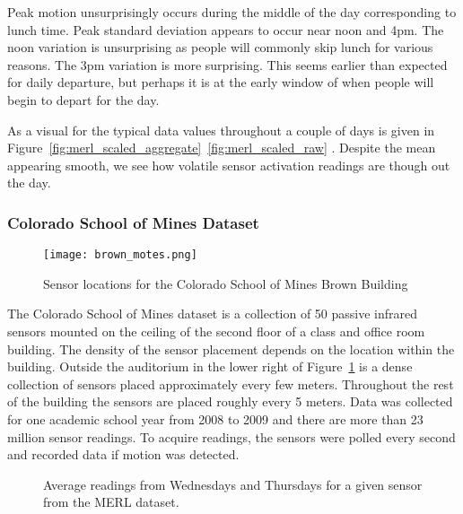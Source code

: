 Peak motion unsurprisingly occurs during the middle of the day corresponding to lunch time.  Peak standard deviation appears to occur near noon and 4pm.  The noon variation is unsurprising as people will commonly skip lunch for various reasons.  The 3pm variation is more surprising.  This seems earlier than expected for daily departure, but perhaps it is at the early window of when people will begin to depart for the day.  

As a visual for the typical data values throughout a couple of days is given in Figure~\ref{fig:merl_scaled_aggregate}~\ref{fig:merl_scaled_raw} .  Despite the mean appearing smooth, we see how volatile sensor activation readings are though out the day.


\subsubsection{Colorado School of Mines Dataset}

\begin{figure}[t!]
	\begin{center}
		\texttt{[image: brown\_motes.png]}
	\end{center}
	\caption{Sensor locations for the Colorado School of Mines Brown Building}
	\label{fig:csmbbfloor}
\end{figure}

The Colorado School of Mines dataset is a collection of 50 passive infrared sensors mounted on the ceiling of the second floor of a class and office room building.  The density of the sensor placement depends on the location within the building.  Outside the auditorium in the lower right of Figure~\ref{fig:csmbbfloor} is a dense collection of sensors placed approximately every few meters.  Throughout the rest of the building the sensors are placed roughly every 5 meters.  Data was collected for one academic school year from 2008 to 2009 and there are more than 23 million sensor readings.  To acquire readings, the sensors were polled every second and recorded data if motion was detected.  

\begin{figure}[h]
	\begin{center}
	\end{center}
	\caption{Average readings from Wednesdays and Thursdays for a given sensor from the MERL dataset.}
	\label{fig:brown_day_raw}
\end{figure}

